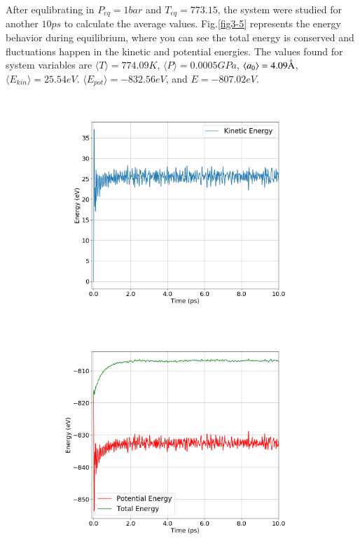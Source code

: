 After equlibrating in $P_{eq} = 1 bar$ and $T_{eq} = 773.15$, the system were studied for another $10 ps$ to calculate the average values. Fig.\ref{fig3-5} represents the energy behavior during equilibrium, where you can see the total energy is conserved and fluctuations happen in the kinetic and potential energies. The values found for system variables are $\langle T \rangle = 774.09K$, $\langle P  \rangle = 0.0005 GPa$, $\langle a_0 \rangle = 4.09 \mbox{\normalfont\AA}$, $\langle E_{kin} \rangle = 25.54 eV$. $\langle E_{pot} \rangle = -832.56 eV$, and $E = -807.02 eV$.
\begin{figure}[!htbp]
	\begin{subfigure}[b]{0.5\textwidth}
		\includegraphics[width=\textwidth]{figs/task3-k.png} 
		\caption{}
	\end{subfigure}%
	\begin{subfigure}[b]{0.5\textwidth}
		\includegraphics[width=\textwidth]{figs/task3-e-p.png} 

\end{subfigure}
\end{figure}
